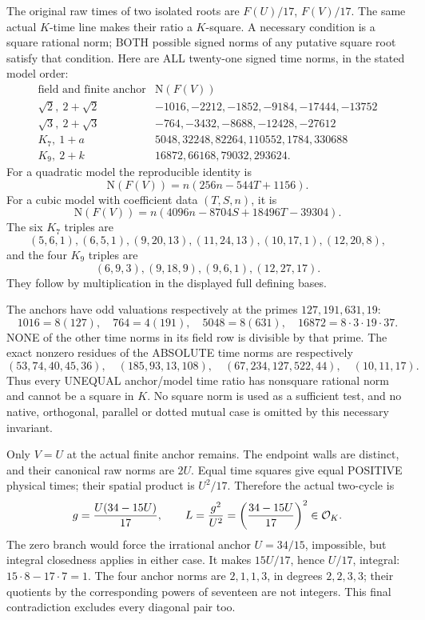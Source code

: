The original raw times of two isolated roots are \(F(U)/17\),
\(F(V)/17\).
The same actual \(K\)-time line makes their ratio a \(K\)-square.
A necessary condition is a square rational norm; BOTH possible
signed norms of any putative square root satisfy that condition.
Here are ALL twenty-one signed time norms, in the stated model order:
\[
\begin{array}{c|l}
\text{field and finite anchor}&\mathrm N(F(V))\\ \hline
\sqrt2,\ 2+\sqrt2&
 -1016,-2212,-1852,-9184,-17444,-13752\\
\sqrt3,\ 2+\sqrt3&
 -764,-3432,-8688,-12428,-27612\\
K_7,\ 1+a&
 5048,32248,82264,110552,1784,330688\\
K_9,\ 2+k&
 16872,66168,79032,293624 .
\end{array}
\]
For a quadratic model the reproducible identity is
\[
 \mathrm N(F(V))=n(256n-544T+1156).
\]
For a cubic model with coefficient data \((T,S,n)\), it is
\[
 \mathrm N(F(V))
      =n(4096n-8704S+18496T-39304).
\]
The six \(K_7\) triples are
\[
 (5,6,1),(6,5,1),(9,20,13),(11,24,13),(10,17,1),(12,20,8),
\]
and the four \(K_9\) triples are
\[
                     (6,9,3),(9,18,9),(9,6,1),(12,27,17).
\]
They follow by multiplication in the displayed full defining bases.

The anchors have odd valuations respectively at the primes
\(127,191,631,19\):
\[
 1016=8(127),\quad764=4(191),\quad5048=8(631),\quad
 16872=8\cdot3\cdot19\cdot37.
\]
NONE of the other time norms in its field row is divisible by
that prime.  The exact nonzero residues of the ABSOLUTE time norms
are respectively
\[
 (53,74,40,45,36),\quad(185,93,13,108),\quad
 (67,234,127,522,44),\quad(10,11,17).
\]
Thus every UNEQUAL anchor/model time ratio has nonsquare rational
norm and cannot be a square in \(K\).
No square norm is used as a sufficient test, and no native,
orthogonal, parallel or dotted mutual case is omitted by this
necessary invariant.

Only \(V=U\) at the actual finite anchor remains.
The endpoint walls are distinct, and their canonical raw norms
are \(2U\).
Equal time squares give equal POSITIVE physical times;
their spatial product is \(U^2/17\).
Therefore the actual two-cycle is
\[
 g={U(34-15U)\over17},\qquad
 L={g^2\over U^2}=\left({34-15U\over17}\right)^2
                     \in\mathcal O_K .
\]
The zero branch would force the irrational anchor \(U=34/15\),
impossible, but integral closedness applies in either case.
It makes \(15U/17\), hence \(U/17\), integral:
\(15\cdot8-17\cdot7=1\).
The four anchor norms are \(2,1,1,3\), in degrees \(2,2,3,3\);
their quotients by the corresponding powers of seventeen
are not integers.
This final contradiction excludes every diagonal pair too.

